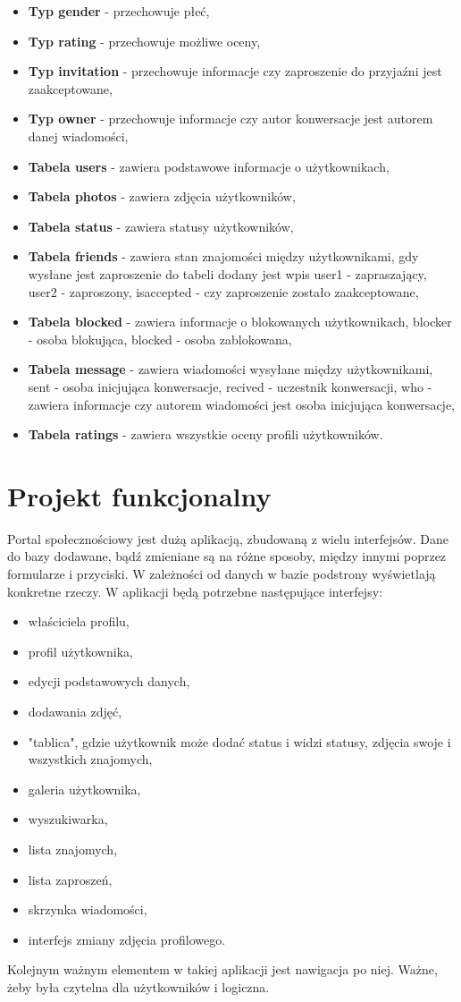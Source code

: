 \documentclass[a4paper,10pt,table]{article}
\begin{document}
\begin{itemize}
\item \textbf{Typ gender} - przechowuje płeć,
\item \textbf{Typ rating} - przechowuje możliwe oceny,
\item \textbf{Typ invitation} - przechowuje informacje czy zaproszenie do przyjaźni jest zaakceptowane,
\item \textbf{Typ owner} - przechowuje informacje czy autor konwersacje jest autorem danej wiadomości,
\item \textbf{Tabela users} - zawiera podstawowe informacje o użytkownikach,
\item \textbf{Tabela photos} - zawiera zdjęcia użytkowników,
\item \textbf{Tabela status} - zawiera statusy użytkowników,
\item \textbf{Tabela friends} - zawiera stan znajomości między użytkownikami, gdy wysłane jest zaproszenie do tabeli dodany jest wpis user1 - zapraszający, user2 - zaproszony, isaccepted - czy zaproszenie zostało zaakceptowane,
\item \textbf{Tabela blocked} - zawiera informacje o blokowanych użytkownikach, blocker - osoba blokująca, blocked - osoba zablokowana,
\item \textbf{Tabela message} - zawiera wiadomości wysyłane między użytkownikami, sent - osoba inicjująca konwersacje, recived - uczestnik konwersacji, who - zawiera informacje czy autorem wiadomości jest osoba inicjująca konwersacje,
\item \textbf{Tabela ratings} - zawiera wszystkie oceny profili użytkowników.
\end{itemize}
\section{Projekt funkcjonalny}
Portal społecznościowy jest dużą aplikacją, zbudowaną z wielu interfejsów. Dane do bazy dodawane, bądź zmieniane są na różne sposoby, między innymi poprzez formularze i przyciski. W zależności od danych w bazie podstrony wyświetlają konkretne rzeczy. W aplikacji będą potrzebne następujące interfejsy:
\begin{itemize}
\item właściciela profilu,
\item profil użytkownika,
\item edycji podstawowych danych,
\item dodawania zdjęć,
\item "tablica", gdzie użytkownik może dodać status i widzi statusy, zdjęcia swoje i wszystkich znajomych,
\item galeria użytkownika,
\item wyszukiwarka,
\item lista znajomych,
\item lista zaproszeń,
\item skrzynka wiadomości,
\item interfejs zmiany zdjęcia profilowego.
\end{itemize}
Kolejnym ważnym elementem w takiej aplikacji jest nawigacja po niej. Ważne, żeby była czytelna dla użytkowników i logiczna.
\newpage
\end{document}
